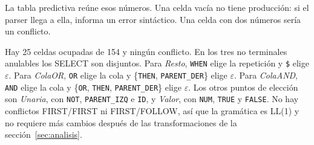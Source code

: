 \documentclass[11pt,a4paper]{article}
\newcommand{\tk}[1]{\texttt{#1}}
\newcommand{\nt}[1]{\textit{#1}}
\begin{document}
La tabla predictiva reúne esos números. Una celda vacía no tiene
producción: si el parser llega a ella, informa un error sintáctico.
Una celda con dos números sería un conflicto.

\begin{center}
  \footnotesize
  \setlength{\tabcolsep}{4pt}
\end{center}

Hay 25 celdas ocupadas de 154 y ningún conflicto. En los tres no
terminales anulables los SELECT son disjuntos. Para \nt{Resto},
\tk{WHEN} elige la repetición y \tk{\$} elige $\varepsilon$. Para
\nt{ColaOR}, \tk{OR} elige la cola y \{\tk{THEN},
\tk{PARENT\_DER}\} elige $\varepsilon$. Para \nt{ColaAND}, \tk{AND}
elige la cola y \{\tk{OR}, \tk{THEN}, \tk{PARENT\_DER}\} elige
$\varepsilon$. Los otros puntos de elección son \nt{Unaria}, con
\tk{NOT}, \tk{PARENT\_IZQ} e \tk{ID}, y \nt{Valor}, con \tk{NUM},
\tk{TRUE} y \tk{FALSE}. No hay conflictos FIRST/FIRST ni
FIRST/FOLLOW, así que la gramática es LL(1) y no requiere más
cambios después de las transformaciones de la sección~\ref{sec:analisis}.
\end{document}
